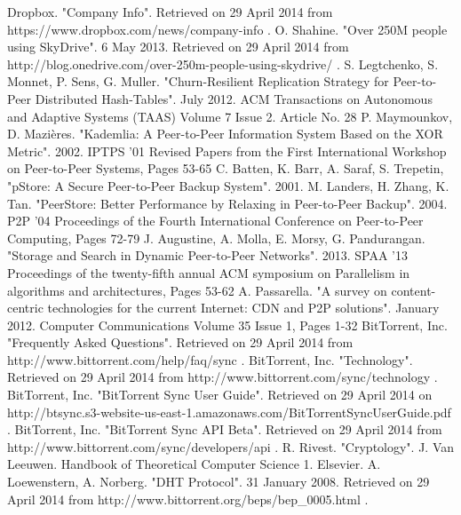 \documentclass[12pt]{report}
\begin{document}
\begin{thebibliography}{11}

 Dropbox. "Company Info". Retrieved on 29 April 2014 from https://www.dropbox.com/news/company-info .
 O. Shahine. "Over 250M people using SkyDrive". 6 May 2013. Retrieved on 29 April 2014 from http://blog.onedrive.com/over-250m-people-using-skydrive/ .
 S. Legtchenko, S. Monnet, P. Sens, G. Muller. "Churn-Resilient Replication Strategy for Peer-to-Peer Distributed Hash-Tables". July 2012. ACM Transactions on Autonomous and Adaptive Systems (TAAS) Volume 7 Issue 2. Article No. 28 
 P. Maymounkov, D. Mazi\`eres. "Kademlia: A Peer-to-Peer Information System Based on the XOR Metric". 2002. IPTPS '01 Revised Papers from the First International Workshop on Peer-to-Peer Systems, Pages 53-65
 C. Batten, K. Barr, A. Saraf, S. Trepetin, "pStore: A Secure Peer-to-Peer Backup System". 2001. 
 M. Landers, H. Zhang, K. Tan. "PeerStore: Better Performance by Relaxing in Peer-to-Peer Backup". 2004. P2P '04 Proceedings of the Fourth International Conference on Peer-to-Peer Computing, Pages 72-79 
 J. Augustine, A. Molla, E. Morsy, G. Pandurangan. "Storage and Search in Dynamic Peer-to-Peer Networks". 2013. SPAA '13 Proceedings of the twenty-fifth annual ACM symposium on Parallelism in algorithms and architectures, Pages 53-62 
 A. Passarella. "A survey on content-centric technologies for the current Internet: CDN and P2P solutions". January 2012. Computer Communications Volume 35 Issue 1, Pages 1-32
 BitTorrent, Inc. "Frequently Asked Questions". Retrieved on 29 April 2014 from http://www.bittorrent.com/help/faq/sync .
 BitTorrent, Inc. "Technology". Retrieved on 29 April 2014 from http://www.bittorrent.com/sync/technology .
 BitTorrent, Inc. "BitTorrent Sync User Guide". Retrieved on 29 April 2014 on http://btsync.s3-website-us-east-1.amazonaws.com/BitTorrentSyncUserGuide.pdf .
 BitTorrent, Inc. "BitTorrent Sync API Beta". Retrieved on 29 April 2014 from http://www.bittorrent.com/sync/developers/api .
 R. Rivest. "Cryptology". J. Van Leeuwen. Handbook of Theoretical Computer Science 1. Elsevier.
 A. Loewenstern, A. Norberg. "DHT Protocol". 31 January 2008. Retrieved on 29 April 2014 from http://www.bittorrent.org/beps/bep\_0005.html .

\end{thebibliography}
\end{document}
